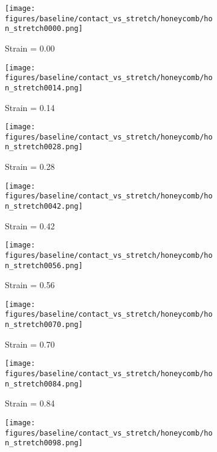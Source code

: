 \vspace*{0cm}
\begin{figure}[H]
    \centering
    \begin{subfigure}[b]{0.49\textwidth}
        \centering
        \texttt{[image: figures/baseline/contact\_vs\_stretch/honeycomb/hon\_stretch0000.png]}
        \caption{Strain = 0.00}
    \end{subfigure}
    \hfill
    \begin{subfigure}[b]{0.49\textwidth}
        \centering
        \texttt{[image: figures/baseline/contact\_vs\_stretch/honeycomb/hon\_stretch0014.png]}
        \caption{Strain = 0.14}
    \end{subfigure}
    \begin{subfigure}[b]{0.49\textwidth}
        \centering
        \texttt{[image: figures/baseline/contact\_vs\_stretch/honeycomb/hon\_stretch0028.png]}
        \caption{Strain = 0.28}
    \end{subfigure}
    \hfill
    \begin{subfigure}[b]{0.49\textwidth}
        \centering
        \texttt{[image: figures/baseline/contact\_vs\_stretch/honeycomb/hon\_stretch0042.png]}
        \caption{Strain = 0.42}
    \end{subfigure}
    \hfill
    \begin{subfigure}[b]{0.49\textwidth}
        \centering
        \texttt{[image: figures/baseline/contact\_vs\_stretch/honeycomb/hon\_stretch0056.png]}
        \caption{Strain = 0.56}
    \end{subfigure}
    \hfill
    \begin{subfigure}[b]{0.49\textwidth}
        \centering
        \texttt{[image: figures/baseline/contact\_vs\_stretch/honeycomb/hon\_stretch0070.png]}
        \caption{Strain = 0.70}
    \end{subfigure}
    \begin{subfigure}[b]{0.49\textwidth}
        \centering
        \texttt{[image: figures/baseline/contact\_vs\_stretch/honeycomb/hon\_stretch0084.png]}
        \caption{Strain = 0.84}
    \end{subfigure}
    \hfill
    \begin{subfigure}[b]{0.49\textwidth}
        \centering
        \texttt{[image: figures/baseline/contact\_vs\_stretch/honeycomb/hon\_stretch0098.png]}

\end{subfigure}
\end{figure}
